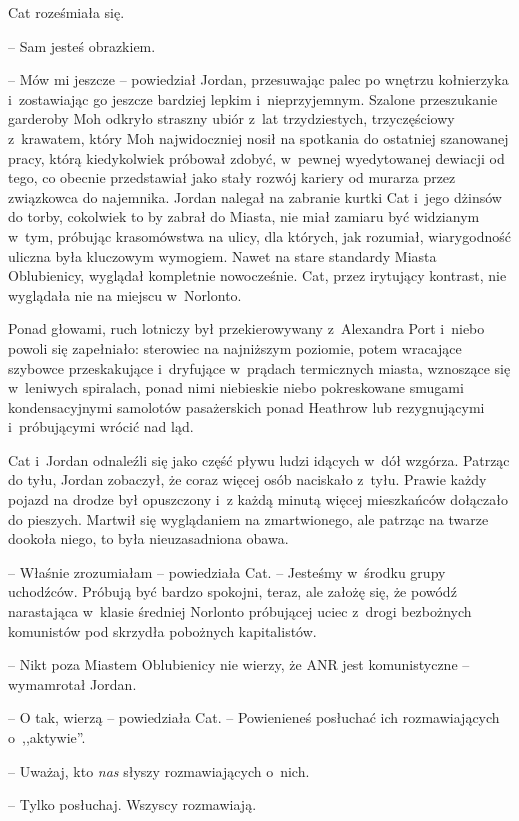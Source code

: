 \documentclass[oneside,polish,11pt,sfheadings]{mwbk}
\begin{document}
Cat roześmiała się. 

-- Sam jesteś obrazkiem.

-- Mów mi jeszcze -- powiedział Jordan, przesuwając palec po wnętrzu
kołnierzyka i~zostawiając go jeszcze bardziej lepkim i~nieprzyjemnym.
Szalone przeszukanie garderoby Moh odkryło straszny ubiór z~lat
trzydziestych, trzyczęściowy z~krawatem, który Moh najwidoczniej nosił
na spotkania do ostatniej szanowanej pracy, którą kiedykolwiek próbował
zdobyć, w~pewnej wyedytowanej dewiacji od tego, co obecnie przedstawiał
jako stały rozwój kariery od murarza przez związkowca do najemnika.
Jordan nalegał na zabranie kurtki Cat i~jego dżinsów do torby, cokolwiek
to by zabrał do Miasta, nie miał zamiaru być widzianym w~tym, próbując
krasomówstwa na ulicy, dla których, jak rozumiał, wiarygodność uliczna
była kluczowym wymogiem. Nawet na stare standardy Miasta Oblubienicy,
wyglądał kompletnie nowocześnie. Cat, przez irytujący kontrast, nie
wyglądała nie na miejscu w~Norlonto.

Ponad głowami, ruch lotniczy był przekierowywany z~Alexandra Port i~niebo powoli się zapełniało: sterowiec na najniższym poziomie, potem
wracające szybowce przeskakujące i~dryfujące w~prądach termicznych
miasta, wznoszące się w~leniwych spiralach, ponad nimi niebieskie niebo
pokreskowane smugami kondensacyjnymi samolotów pasażerskich ponad
Heathrow lub rezygnującymi i~próbującymi wrócić nad ląd.

Cat i~Jordan odnaleźli się jako część pływu ludzi idących w~dół wzgórza.
Patrząc do tyłu, Jordan zobaczył, że coraz więcej osób naciskało z~tyłu.
Prawie każdy pojazd na drodze był opuszczony i~z każdą minutą więcej
mieszkańców dołączało do pieszych. Martwił się wyglądaniem na
zmartwionego, ale patrząc na twarze dookoła niego, to była
nieuzasadniona obawa.

-- Właśnie zrozumiałam -- powiedziała Cat. -- Jesteśmy w~środku grupy
uchodźców. Próbują być bardzo spokojni, teraz, ale założę się, że powódź
narastająca w~klasie średniej Norlonto próbującej uciec z~drogi
bezbożnych komunistów pod skrzydła pobożnych kapitalistów.

-- Nikt poza Miastem Oblubienicy nie wierzy, że ANR jest komunistyczne -- wymamrotał Jordan.

-- O tak, wierzą -- powiedziała Cat. -- Powienieneś posłuchać ich
rozmawiających o~,,aktywie''.

-- Uważaj, kto \emph{nas} słyszy rozmawiających o~nich.

-- Tylko posłuchaj. Wszyscy rozmawiają.
\end{document}
